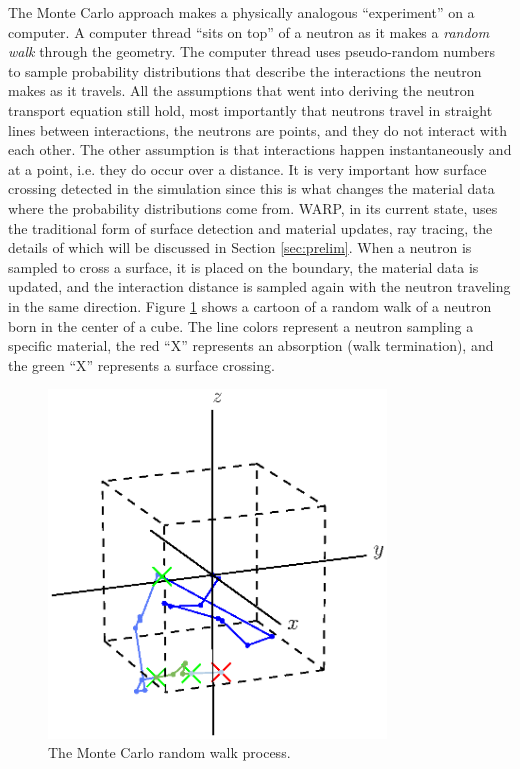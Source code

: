 The Monte Carlo approach makes a physically analogous ``experiment'' on a computer.  A computer thread ``sits on top'' of a neutron as it makes a \emph{random walk} through the geometry.  The computer thread uses pseudo-random numbers to sample probability distributions that describe the interactions the neutron makes as it travels.  All the assumptions that went into deriving the neutron transport equation still hold, most importantly that neutrons travel in straight lines between interactions, the neutrons are points, and they do not interact with each other.  The other assumption is that interactions happen instantaneously and at a point, i.e. they do occur over a distance.  It is very important how surface crossing detected in the simulation since this is what changes the material data where the probability distributions come from.  WARP, in its current state, uses the traditional form of surface detection and material updates, ray tracing, the details of which will be discussed in Section \ref{sec:prelim}.  When a neutron is sampled to cross a surface, it is placed on the boundary, the material data is updated, and the interaction distance is sampled again with the neutron traveling in the same direction.  Figure \ref{random_walk} shows a cartoon of a random walk of a neutron born in the center of a cube.  The line colors represent a neutron sampling a specific material, the red ``X'' represents an absorption (walk termination), and the green ``X'' represents a surface crossing.

\begin{figure}[h!] 
  \centering
    \includegraphics[width=0.8\textwidth,trim= 0cm 2.5cm 0cm 0cm]{graphics/random_walk_accepted.eps}
     \caption{The Monte Carlo random walk process. \label{random_walk}}
\end{figure}


